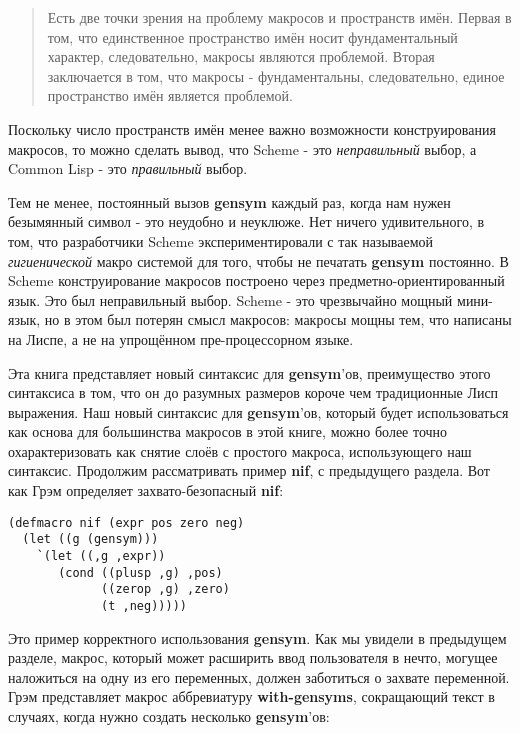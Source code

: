 \begin{quote}
Есть две точки зрения на проблему макросов и пространств имён. Первая в том, что единственное пространство имён носит фундаментальный характер, следовательно, макросы являются проблемой. Вторая заключается в том, что макросы - фундаментальны, следовательно, единое пространство имён является проблемой.
\end{quote}

Поскольку число пространств имён менее важно возможности конструирования макросов, то можно сделать вывод, что Scheme - это \emph{неправильный} выбор, а Common Lisp - это \emph{правильный} выбор.

Тем не менее, постоянный вызов \textbf{gensym} каждый раз, когда нам нужен безымянный символ - это неудобно и неуклюже. Нет ничего удивительного, в том, что разработчики Scheme экспериментировали с так называемой \emph{гигиенической} макро системой для того, чтобы не печатать \textbf{gensym} постоянно. В Scheme конструирование макросов построено через предметно-ориентированный язык. Это был неправильный выбор. Scheme - это чрезвычайно мощный мини-язык, но в этом был потерян смысл макросов: макросы мощны тем, что написаны на Лиспе, а не на упрощённом пре-процессорном языке.

Эта книга представляет новый синтаксис для \textbf{gensym}'ов, преимущество этого синтаксиса в том, что он до разумных размеров короче чем традиционные Лисп выражения. Наш новый синтаксис для \textbf{gensym}'ов, который будет использоваться как основа для большинства макросов в этой книге, можно более точно охарактеризовать как снятие слоёв с простого макроса, использующего наш синтаксис. Продолжим рассматривать пример \textbf{nif}, с предыдущего раздела. Вот как Грэм определяет захвато-безопасный \textbf{nif}:

\begin{verbatim}
(defmacro nif (expr pos zero neg)
  (let ((g (gensym)))
    `(let ((,g ,expr))
       (cond ((plusp ,g) ,pos)
             ((zerop ,g) ,zero)
             (t ,neg)))))
\end{verbatim}

Это пример корректного использования \textbf{gensym}. Как мы увидели в предыдущем разделе, макрос, который может расширить ввод пользователя в нечто, могущее наложиться на одну из его переменных, должен заботиться о захвате переменной. Грэм представляет макрос аббревиатуру \textbf{with-gensyms}, сокращающий текст в случаях, когда нужно создать несколько \textbf{gensym}'ов:

